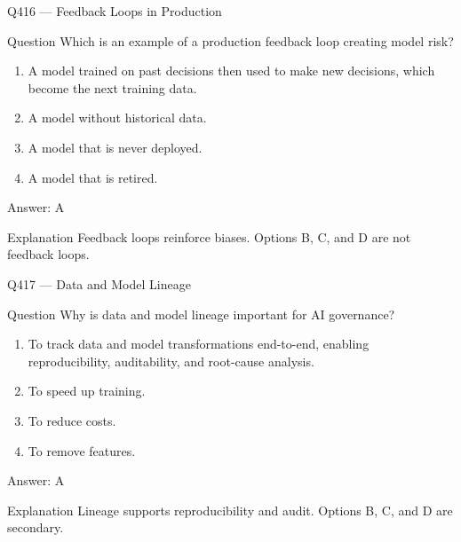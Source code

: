 \documentclass[aspectratio=169,8pt]{beamer}
\begin{document}
	\begin{frame}{Q416 --- Feedback Loops in Production}
		\begin{block}{Question}
			Which is an example of a production feedback loop creating model risk?
			\begin{enumerate}
				\item A model trained on past decisions then used to make new decisions, which become the next training data.
				\item A model without historical data.
				\item A model that is never deployed.
				\item A model that is retired.
			\end{enumerate}
		\end{block}
		\begin{exampleblock}{Answer: A}\end{exampleblock}
		\begin{block}{Explanation}
			Feedback loops reinforce biases. Options B, C, and D are not feedback loops.
		\end{block}
	\end{frame}
	
	\begin{frame}{Q417 --- Data and Model Lineage}
		\begin{block}{Question}
			Why is data and model lineage important for AI governance?
			\begin{enumerate}
				\item To track data and model transformations end-to-end, enabling reproducibility, auditability, and root-cause analysis.
				\item To speed up training.
				\item To reduce costs.
				\item To remove features.
			\end{enumerate}
		\end{block}
		\begin{exampleblock}{Answer: A}\end{exampleblock}
		\begin{block}{Explanation}
			Lineage supports reproducibility and audit. Options B, C, and D are secondary.
		\end{block}
	\end{frame}
	
\end{document}
